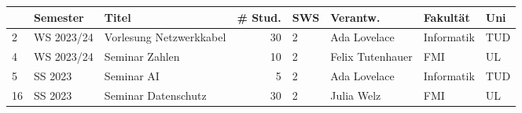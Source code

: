 \begin{tabular}{lllrllll}
\toprule
 & Semester & Titel & # Stud. & SWS & Verantw. & Fakultät & Uni \\
\midrule
2 & WS 2023/24 & Vorlesung Netzwerkkabel & 30 & 2 & Ada Lovelace & Informatik & TUD \\
4 & WS 2023/24 & Seminar Zahlen & 10 & 2 & Felix Tutenhauer & FMI & UL \\
5 & SS 2023 & Seminar AI & 5 & 2 & Ada Lovelace & Informatik & TUD \\
16 & SS 2023 & Seminar Datenschutz & 30 & 2 & Julia Welz & FMI & UL \\
\bottomrule
\end{tabular}
